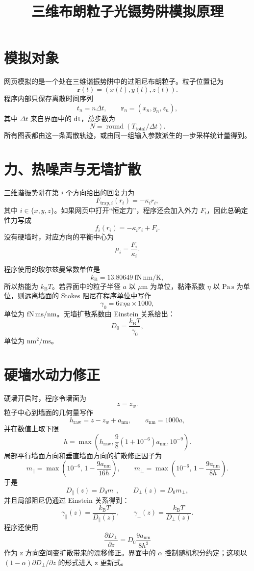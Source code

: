 \documentclass[UTF8,a4paper,12pt,fontset=fandol]{ctexart}
\title{三维布朗粒子光镊势阱模拟原理}
\author{}
\date{}
\newcommand{\kb}{k_{\mathrm B}}
\begin{document}
\maketitle

\section{模拟对象}

网页模拟的是一个处在三维谐振势阱中的过阻尼布朗粒子。粒子位置记为
\[
  \mathbf r(t)=(x(t),y(t),z(t)).
\]
程序内部只保存离散时间序列
\[
  t_n=n\Delta t,\qquad
  \mathbf r_n=(x_n,y_n,z_n),
\]
其中 $\Delta t$ 来自界面中的 \texttt{dt}，总步数为
\[
  N=\operatorname{round}(T_{\mathrm{total}}/\Delta t).
\]
所有图表都由这一条离散轨迹，或由同一组输入参数派生的一步采样统计量得到。

\section{力、热噪声与无墙扩散}

三维谐振势阱在第 $i$ 个方向给出的回复力为
\[
  F_{\mathrm{trap},i}(r_i)=-\kappa_i r_i,
\]
其中 $i\in\{x,y,z\}$。如果网页中打开“恒定力”，程序还会加入外力 $F_i$，因此总确定性力写成
\[
  f_i(r_i)=-\kappa_i r_i+F_i.
\]
没有硬墙时，对应方向的平衡中心为
\[
  \mu_i=\frac{F_i}{\kappa_i}.
\]

程序使用的玻尔兹曼常数单位是
\[
  \kb=13.80649\ \mathrm{fN\,nm/K},
\]
所以热能为 $\kb T$。若界面中的粒子半径 $a$ 以 $\mu\mathrm m$ 为单位，黏滞系数 $\eta$ 以 $\mathrm{Pa\,s}$ 为单位，则远离墙面的 Stokes 阻尼在程序单位中写作
\[
  \gamma_0=6\pi\eta a\times 1000,
\]
单位为 $\mathrm{fN\,ms/nm}$。无墙扩散系数由 Einstein 关系给出：
\[
  D_0=\frac{\kb T}{\gamma_0},
\]
单位为 $\mathrm{nm^2/ms}$。

\section{硬墙水动力修正}

硬墙开启时，程序令墙面为
\[
  z=z_w.
\]
粒子中心到墙面的几何量写作
\[
  h_{\mathrm{raw}}=z-z_w+a_{\mathrm{nm}},
  \qquad a_{\mathrm{nm}}=1000a,
\]
并在数值上取下限
\[
  h=\max\!\left(h_{\mathrm{raw}},
  \frac{9}{8}(1+10^{-6})a_{\mathrm{nm}},
  10^{-9}\right).
\]
局部平行墙面方向和垂直墙面方向的扩散修正因子为
\[
  m_{\parallel}=\max\!\left(10^{-6},\,1-\frac{9a_{\mathrm{nm}}}{16h}\right),
  \qquad
  m_{\perp}=\max\!\left(10^{-6},\,1-\frac{9a_{\mathrm{nm}}}{8h}\right).
\]
于是
\[
  D_{\parallel}(z)=D_0m_{\parallel},
  \qquad
  D_{\perp}(z)=D_0m_{\perp},
\]
并且局部阻尼仍通过 Einstein 关系得到：
\[
  \gamma_{\parallel}(z)=\frac{\kb T}{D_{\parallel}(z)},
  \qquad
  \gamma_{\perp}(z)=\frac{\kb T}{D_{\perp}(z)}.
\]
程序还使用
\[
  \frac{\partial D_{\perp}}{\partial z}
  =D_0\frac{9a_{\mathrm{nm}}}{8h^2}
\]
作为 z 方向空间变扩散带来的漂移修正。界面中的 $\alpha$ 控制随机积分约定；这项以 $(1-\alpha)\partial D_{\perp}/\partial z$ 的形式进入 z 更新式。
\end{document}

